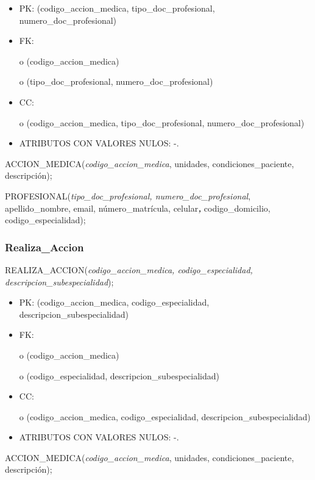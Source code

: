 \documentclass[a4paper,11pt]{article}
\begin{document}
\begin{itemize}
\item PK: (codigo\_accion\_medica, tipo\_doc\_profesional, numero\_doc\_profesional)

\item FK: 

o (codigo\_accion\_medica)

o (tipo\_doc\_profesional, numero\_doc\_profesional)

\item CC:

o (codigo\_accion\_medica, tipo\_doc\_profesional, numero\_doc\_profesional)

\item ATRIBUTOS CON VALORES NULOS:  -.
\end{itemize}

ACCION\_MEDICA(\emph{codigo\_accion\_medica}, unidades, condiciones\_paciente, 
descripción);

PROFESIONAL(\emph{tipo\_doc\_profesional, numero\_doc\_profesional}, apellido\_nombre, 
email, número\_matrícula, celular\textit{\textbf{, }}codigo\_domicilio, codigo\_especialidad);\label{HToc293405848}

\subsubsection{\textbf{Realiza\_Accion}}

REALIZA\_ACCION(\emph{codigo\_accion\_medica, codigo\_especialidad, descripcion\_subespecialidad});

\begin{itemize}
\item PK: (codigo\_accion\_medica, codigo\_especialidad, descripcion\_subespecialidad)

\item FK: 

o (codigo\_accion\_medica)

o (codigo\_especialidad, descripcion\_subespecialidad)

\item CC:

o (codigo\_accion\_medica, codigo\_especialidad, descripcion\_subespecialidad)

\item ATRIBUTOS CON VALORES NULOS:  -.
\end{itemize}

ACCION\_MEDICA(\emph{codigo\_accion\_medica}, unidades, condiciones\_paciente, 
descripción);
\end{document}
